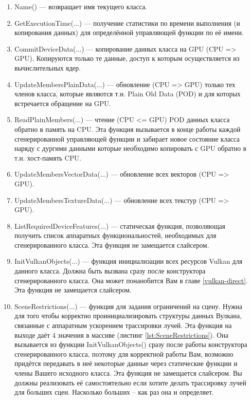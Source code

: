 \documentclass[11pt,fleqn,english,russian]{report} %
\begin{document}
\begin{enumerate}
	\item Name() --- возвращает имя текущего класса. 
	
	\item GetExecutionTime(...) --- получение статистики по времени выполнения (и копирования данных) для определённой управляющей функции по её имени.
	\item CommitDeviceData(...) --- копирование данных класса на GPU (CPU => GPU). Копируются только те данные, доступ к которым осуществляется из вычислительных ядер. 
	
	\item UpdateMembersPlainData(...) --- обновление (CPU => GPU) только тех членов класса, которые являются т.н. Plain Old Data (POD) и для которых встречается обращение на GPU.
	
	\item ReadPlainMembers(...) --- чтение (CPU <= GPU) POD данных класса обратно в память на CPU. Эта функция вызывается в конце работы каждой сгенерированной управляющей функции и забирает новое состояние класса наряду с дургими данными которые необходимо копировать с GPU обратно в т.н. хост-память CPU.
	
	\item UpdateMembersVectorData(...) --- обновление всех векторов (CPU => GPU).
	
    \item UpdateMembersTextureData(...) --- обновление всех текстур (CPU => GPU).
    
    \item ListRequiredDeviceFeatures(...) --- статическая функция, позволяющая получить список аппаратных функциональностей, необходимых для сгенерированного класса. Эта функция не замещается слайсером.
    
    \item InitVulkanObjects(...) --- функция инициализации всех ресурсов Vulkan для данного класса. Должна быть вызвана сразу после конструктора сгенерированного класса. Она может понанобится Вам в главе \ref{vulkan-direct}. Эта функция не замещается слайсером.
    
    \item SceneRestrictions(...) --- функция для задания ограничений на сцену. Нужна для того чтобы корректно проинициализировать структуры данных Вулкана, связанные с аппаратным ускорением трассировки лучей. Эта функция на выходе даёт 4 значения в массиве (листинг \ref{lst:SceneRestrictions}). Она вызывается из функции InitVulkanObjects() сразу после работы конструктора сгенерированного класса, поэтому для корректной работы Вам, возможно придётся передавать в неё некоторые данные через статические функции и члены Вашего исходного класса. Эта функция не замещается слайсером. Вы должны реализовать её самостоятельно если хотите делать трассировку лучей для больших сцен. Насколько больших -- как раз она и определяет.
     
\end{enumerate}
\end{document}
